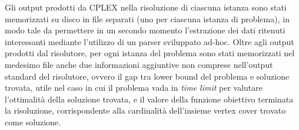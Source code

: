 Gli output prodotti da CPLEX nella risoluzione di ciascuna istanza sono stati memorizzati su disco in file separati (uno per ciascuna istanza di problema), in modo tale da permettere in un secondo momento l'estrazione dei dati ritenuti interessanti mediante l'utilizzo di un parser sviluppato ad-hoc. Oltre agli output prodotti dal risolutore, per ogni istanza del problema sono stati memorizzati nel medesimo file anche due informazioni aggiuntive non comprese nell'output standard del risolutore, ovvero il gap tra lower bound del problema e soluzione trovata, utile nel caso in cui il problema vada in \textit{time limit} per valutare l'ottimalità della soluzione trovata, e il valore della funzione obiettivo terminata la risoluzione, corrispondente alla cardinalità dell'insieme vertex cover trovato come soluzione.

